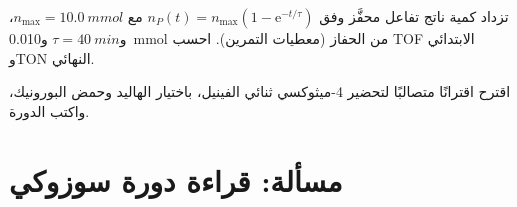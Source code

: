 \begin{exercise}[$\star\star\star$]\label{exo:b2:catalytic-cycles:11}
تزداد كمية ناتج تفاعل محفَّز وفق $n_P(t) = n_{\max}(1 - \mathrm e^{-t/\tau})$
مع $n_{\max} = \qty{10.0}{mmol}$، و$\tau = \qty{40}{min}$ و\qty{0.010}{mmol} من الحفاز
(معطيات التمرين). احسب TOF الابتدائي وTON النهائي.
\end{exercise}

\begin{exercise}[$\star\star\star$]\label{exo:b2:catalytic-cycles:12}
اقترح اقترانًا متصالبًا لتحضير 4-ميثوكسي ثنائي الفينيل، باختيار الهاليد وحمض
البورونيك، واكتب الدورة.
\end{exercise}

\section{مسألة: قراءة دورة سوزوكي}

